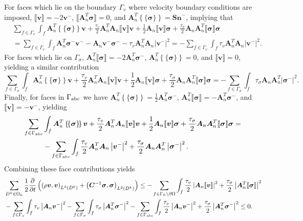 \documentclass{siamart0216}
\newcommand{\pd}[2]{\frac{\partial#1}{\partial#2}}
\newcommand{\LRp}[1]{\left( #1 \right)}
\newcommand{\LRb}[1]{\left| #1 \right|}
\newcommand{\LRc}[1]{\left\{ #1 \right\}}
\newcommand{\jump}[1] {\ensuremath{\llbracket#1\rrbracket}}
\newcommand{\avg}[1] {\ensuremath{\LRc{\!\{#1\}\!}}}
\renewcommand{\Oh}{{\Omega_h}}
\newcommand{\Lk}{L^2\LRp{D^k}}
\begin{document}
For faces which lie on the boundary $\Gamma_v$ where velocity boundary conditions are imposed, $\jump{\bm{v}} = -2\bm{v}^-$, $\jump{\bm{A}_n^T\bm{\sigma}} = 0$, and $\bm{A}_n^T\avg{\bm{\sigma}} = \bm{Sn}^-$, implying that 
\begin{align*}
&\sum_{f\in \Gamma_v} \int_f \bm{A}_n^T\avg{\bm{\sigma}}\bm{v} + \frac{\tau_v}{2}\bm{A}_n^T\bm{A}_n\jump{\bm{v}}\bm{v} + \frac{1}{2}\bm{A}_n\jump{\bm{v}}\bm{\sigma} + \frac{\tau_\sigma}{2}\bm{A}_n\bm{A}_n^T\jump{\bm{\sigma}}\bm{\sigma}\\
&= \sum_{f\in \Gamma_v} \int_f \bm{A}_n^T \bm{\sigma}^-\bm{v}^- - \bm{A}_n \bm{v}^- \bm{\sigma}^- - \tau_v \bm{A}_n^T\bm{A}_n \LRb{\bm{v}^-}^2 = - \sum_{f\in \Gamma_v} \int_f \tau_v \bm{A}_n^T\bm{A}_n \LRb{\bm{v}^-}^2 .
\end{align*}
For faces which lie on $\Gamma_\sigma$, $\bm{A}_n^T\jump{\bm{\sigma}} = -2\bm{A}_n^T\bm{\sigma}^-$, $\bm{A}_n^T\avg{\bm{\sigma}} = 0$, and $\jump{\bm{v}} = 0$, yielding a similar contribution
\[
\sum_{f\in \Gamma_\sigma} \int_f \bm{A}_n^T\avg{\bm{\sigma}}\bm{v} + \frac{\tau_v}{2}\bm{A}_n^T\bm{A}_n\jump{\bm{v}}\bm{v} + \frac{1}{2}\bm{A}_n\jump{\bm{v}}\bm{\sigma} + \frac{\tau_\sigma}{2}\bm{A}_n\bm{A}_n^T\jump{\bm{\sigma}}\bm{\sigma} = - \sum_{f\in \Gamma_\sigma} \int_f \tau_\sigma \bm{A}_n\bm{A}_n^T \LRb{\bm{\sigma}^-}^2.
\]
Finally, for faces in $\Gamma_{\rm abc}$ we have $\bm{A}_n^T\avg{\bm{\sigma}} =\frac{1}{2} \bm{A}_n^T\bm{\sigma}^- $, $\bm{A}_n^T\jump{\bm{\sigma}} = -\bm{A}_n^T\bm{\sigma}^-$, and $\jump{\bm{v}} = -\bm{v}^-$, yielding
\begin{align*}
\sum_{f\in \Gamma_{\rm abc}} &\int_f \bm{A}_n^T\avg{\bm{\sigma}}\bm{v} + \frac{\tau_v}{2}\bm{A}_n^T\bm{A}_n\jump{\bm{v}}\bm{v} + \frac{1}{2}\bm{A}_n\jump{\bm{v}}\bm{\sigma} + \frac{\tau_\sigma}{2}\bm{A}_n\bm{A}_n^T\jump{\bm{\sigma}}\bm{\sigma} =\\
& - \sum_{f\in \Gamma_{\rm abc}} \int_f \frac{\tau_v}{2} \bm{A}_n^T\bm{A}_n \LRb{\bm{v}^-}^2 + \frac{\tau_\sigma}{2} \bm{A}_n\bm{A}_n^T \LRb{\bm{\sigma}^-}^2.  
\end{align*}
Combining these face contributions yields
\begin{align}
&\sum_{D^k\in \Oh} \frac{1}{2}\pd{}{t}\LRp{\LRp{\rho \bm{v},\bm{v}}_{\Lk} + \LRp{\bm{C}^{-1} \bm{\sigma},\bm{\sigma}}_{\Lk}} \leq - \sum_{f \in\Gamma_h \setminus \partial \Omega} \int_{f} \frac{\tau_v}{2}\LRb{\bm{A}_n\jump{\bm{v}}}^2 + \frac{\tau_\sigma}{2}\LRb{\bm{A}_n^T\jump{\bm{\sigma}}}^2\nonumber\\
& - \sum_{f\in \Gamma_v} \int_f \tau_v  \LRb{\bm{A}_n\bm{v}^-}^2  - \sum_{f\in \Gamma_\sigma} \int_f \tau_\sigma  \LRb{\bm{A}_n^T\bm{\sigma}^-}^2- \sum_{f\in \Gamma_{\rm abc}} \int_f \frac{\tau_v}{2} \LRb{\bm{A}_n\bm{v}^-}^2 + \frac{\tau_\sigma}{2} \LRb{\bm{A}_n^T\bm{\sigma}^-}^2 \leq 0.  
\label{eq:stability}
\end{align}
\end{document}
